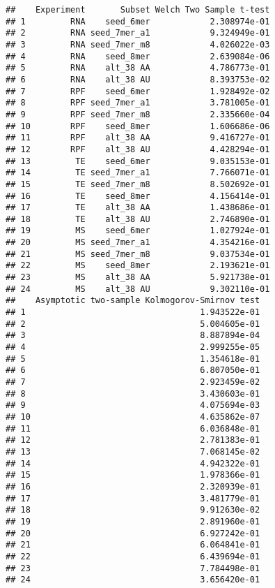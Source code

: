 \documentclass[
]{article}
\begin{document}
\begin{verbatim}
##    Experiment       Subset Welch Two Sample t-test
## 1         RNA    seed_6mer            2.308974e-01
## 2         RNA seed_7mer_a1            9.324949e-01
## 3         RNA seed_7mer_m8            4.026022e-03
## 4         RNA    seed_8mer            2.639084e-06
## 5         RNA    alt_38 AA            4.786773e-01
## 6         RNA    alt_38 AU            8.393753e-02
## 7         RPF    seed_6mer            1.928492e-02
## 8         RPF seed_7mer_a1            3.781005e-01
## 9         RPF seed_7mer_m8            2.335660e-04
## 10        RPF    seed_8mer            1.606686e-06
## 11        RPF    alt_38 AA            9.416727e-01
## 12        RPF    alt_38 AU            4.428294e-01
## 13         TE    seed_6mer            9.035153e-01
## 14         TE seed_7mer_a1            7.766071e-01
## 15         TE seed_7mer_m8            8.502692e-01
## 16         TE    seed_8mer            4.156414e-01
## 17         TE    alt_38 AA            1.438686e-01
## 18         TE    alt_38 AU            2.746890e-01
## 19         MS    seed_6mer            1.027924e-01
## 20         MS seed_7mer_a1            4.354216e-01
## 21         MS seed_7mer_m8            9.037534e-01
## 22         MS    seed_8mer            2.193621e-01
## 23         MS    alt_38 AA            5.921738e-01
## 24         MS    alt_38 AU            9.302110e-01
##    Asymptotic two-sample Kolmogorov-Smirnov test
## 1                                   1.943522e-01
## 2                                   5.004605e-01
## 3                                   8.887894e-04
## 4                                   2.999255e-05
## 5                                   1.354618e-01
## 6                                   6.807050e-01
## 7                                   2.923459e-02
## 8                                   3.430603e-01
## 9                                   4.075694e-03
## 10                                  4.635862e-07
## 11                                  6.036848e-01
## 12                                  2.781383e-01
## 13                                  7.068145e-02
## 14                                  4.942322e-01
## 15                                  1.978366e-01
## 16                                  2.320939e-01
## 17                                  3.481779e-01
## 18                                  9.912630e-02
## 19                                  2.891960e-01
## 20                                  6.927242e-01
## 21                                  6.064841e-01
## 22                                  6.439694e-01
## 23                                  7.784498e-01
## 24                                  3.656420e-01
\end{verbatim}
\end{document}
